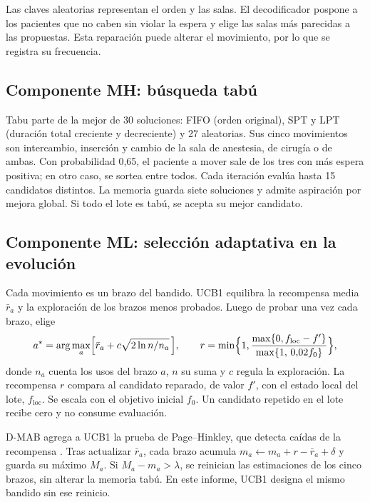 \documentclass[12pt,letterpaper]{report}
\begin{document}
Las claves aleatorias representan el orden y las salas. El decodificador pospone
a los pacientes que no caben sin violar la espera y elige las salas más parecidas
a las propuestas. Esta reparación puede alterar el movimiento, por lo que se
registra su frecuencia.

\subsection{Componente MH: búsqueda tabú}
Tabu \parencite{glover1989} parte de la mejor de 30 soluciones: FIFO (orden
original), SPT y LPT (duración total creciente y decreciente) y 27 aleatorias.
Sus cinco movimientos son intercambio, inserción y cambio de la sala de anestesia,
de cirugía o de ambas. Con probabilidad 0,65, el paciente a mover sale de los
tres con más espera positiva; en otro caso, se sortea entre todos. Cada iteración
evalúa hasta 15 candidatos distintos. La memoria guarda siete soluciones y admite
aspiración por mejora global. Si todo el lote es tabú, se acepta su mejor candidato.

\subsection{Componente ML: selección adaptativa en la evolución}
Cada movimiento es un brazo del bandido. UCB1 \parencite{auer2002} equilibra la
recompensa media $\bar r_a$ y la exploración de los brazos menos probados. Luego
de probar una vez cada brazo, elige
\begin{equation}
 a^*=\arg\max_a\Bigl[\bar r_a+c\sqrt{2\ln n/n_a}\,\Bigr],
 \qquad r=\min\Bigl\{1,\frac{\max\{0,f_{\mathrm{loc}}-f'\}}{\max\{1,\,0{,}02f_0\}}\Bigr\},
 \label{eq:bandido}
\end{equation}
\noindent donde $n_a$ cuenta los usos del brazo $a$, $n$ su suma y $c$ regula la
exploración. La recompensa $r$ compara al candidato reparado, de valor $f'$, con
el estado local del lote, $f_{\mathrm{loc}}$. Se escala con el objetivo inicial $f_0$. Un candidato repetido en el lote recibe cero y no consume evaluación.

D-MAB agrega a UCB1 la prueba de Page--Hinkley, que detecta caídas de la
recompensa \parencite{dacosta2008}. Tras actualizar $\bar r_a$, cada brazo acumula
$m_a\leftarrow m_a+r-\bar r_a+\delta$ y guarda su máximo $M_a$. Si
$M_a-m_a>\lambda$, se reinician las estimaciones de los cinco brazos, sin alterar
la memoria tabú. En este informe, UCB1 designa el mismo bandido sin ese reinicio.
\end{document}
